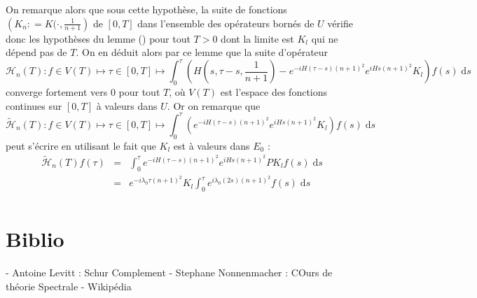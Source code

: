 \documentclass[12pt,openany,a4paper, titlepage]{article}
\newcommand{\f}[2]{\frac{#1}{#2}}
\newcommand{\lp}{\left(}
\newcommand{\rp}{\right)}
\newcommand{\dd}{\;\mathrm{d}}
\newcommand{\St}[2]{e^{-i #1 #2}}
\newcommand{\Stt}[2]{e^{i #1 #2}}
\theoremstyle{definition}
\theoremstyle{definition}
\theoremstyle{definition}
\theoremstyle{definition}
\theoremstyle{definition}
\theoremstyle{definition}
\begin{document}
On remarque alors que sous cette hypothèse, la suite de fonctions $\lp K_n : = K(\cdot,\f{1}{n+1}\rp$ de $[0,T]$ dans l'ensemble des opérateurs bornés de $U$ vérifie donc les hypothèses du lemme () pour tout $T>0$ dont la limite est $K_l$ qui ne dépend pas de $T$. On en déduit alors par ce lemme que la suite d'opérateur
\begin{equation}
    \mathcal{H}_n(T) : f\in V(T) \mapsto \tau\in[0,T] \mapsto \int_0^\tau \lp H(s,\tau - s, \f{1}{n+1}) - \St{H}{(\tau-s)(n+1)^2}\Stt{H}{s(n+1)^2} K_l \rp f(s) \dd s 
\end{equation}
converge fortement vers $0$ pour tout $T$, où $V(T)$ est l'espace des fonctions continues sur $[0,T]$ à valeurs dans $U$. Or on remarque que
\begin{equation}
    \tilde{\mathcal{H}}_n(T) : f\in V(T) \mapsto \tau\in[0,T] \mapsto \int_0^\tau \lp \St{H}{(\tau-s)(n+1)^2}\Stt{H}{s(n+1)^2} K_l \rp f(s) \dd s
\end{equation}
peut s'écrire en utilisant le fait que $K_l$ est à valeurs dans $E_0$ :
\begin{eqnarray}
    \tilde{\mathcal{H}}_n(T)f(\tau) &=& \int_0^\tau \St{H}{(\tau-s)(n+1)^2}\Stt{H}{s(n+1)^2} P K_l f(s)\dd s \\
                                    &=& \St{\lambda_0}{\tau(n+1)^2}K_l \int_0^\tau \Stt{\lambda_0}{(2s)(n+1)^2} f(s) \dd s \\
\end{eqnarray}




\newpage

\appendix
\appendixpage
\addappheadtotoc

\section{Biblio}

- Antoine Levitt : Schur Complement
- Stephane Nonnenmacher : COurs de théorie Spectrale
- Wikipédia %
\cite{HOWLAND1975415}
\cite{Levitt}
\cite{Orth1990}
\cite{Macher}
\printbibliography
\end{document}
